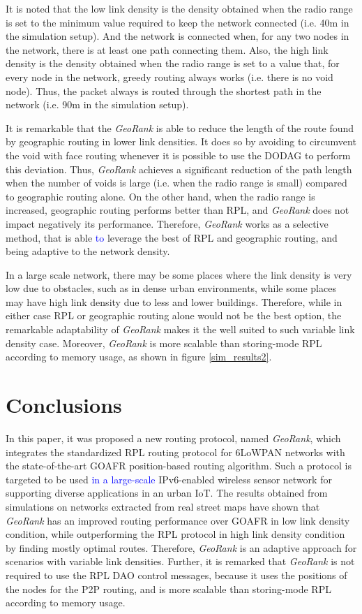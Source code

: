 \documentclass[final,authoryear,3p,twocolumn]{elsarticle}
\newcommand{\rev}{\textcolor{blue}}
\begin{document}
It is noted that the low link density is the density obtained when the radio range is set to the minimum value required to keep the network connected (i.e. 40m in the simulation setup). And the network is connected when, for any two nodes in the network, there is at least one path connecting them. Also, the high link density is the density obtained when the radio range is set to a value that, for every node in the network, greedy routing always works (i.e. there is no void node). Thus, the packet always is routed through the shortest path in the network (i.e. 90m in the simulation setup).

It is remarkable that the \textit{GeoRank} is able to reduce the length of the route found by geographic routing in lower link densities. It does so by avoiding to circumvent the void with face routing whenever it is possible to use the DODAG to perform this deviation. Thus, \textit{GeoRank} achieves a significant reduction of the path length when the number of voids is large (i.e. when the radio range is small) compared to geographic routing alone. On the other hand, when the radio range is increased, geographic routing performs better than RPL, and \textit{GeoRank} does not impact negatively its performance. Therefore, \textit{GeoRank} works as a selective method, that is able \rev{to} leverage the best of RPL and geographic routing, and being adaptive to the network density.

In a large scale network, there may be some places where the link density is very low due to obstacles, such as in dense urban environments, while some places may have high link density due to less and lower buildings. Therefore, while in either case RPL or geographic routing alone would not be the best option, the remarkable adaptability of \textit{GeoRank} makes it the well suited to such variable link density case. Moreover, \textit{GeoRank} is more scalable than storing-mode RPL according to memory usage, as shown in figure \ref{sim_results2}.

\section{Conclusions}
\label{secConclusion}

In this paper, it was proposed a new routing protocol, named \textit{GeoRank}, which integrates the standardized RPL routing protocol for 6LoWPAN networks with the state-of-the-art GOAFR position-based routing algorithm. 
Such a protocol is targeted to be used \rev{in a large-scale} IPv6-enabled wireless sensor network for supporting diverse applications in an urban IoT. The results obtained from simulations on networks extracted from real street maps have shown that \textit{GeoRank} has an improved routing performance over GOAFR in low link density condition, while outperforming the RPL protocol in high link density condition by finding mostly optimal routes. Therefore, \textit{GeoRank} is an adaptive approach for scenarios with variable link densities. Further, it is remarked that \textit{GeoRank} is not required to use the RPL DAO control messages, because it uses the positions of the nodes for the P2P routing, and is more scalable than storing-mode RPL according to memory usage. 
	
\end{document}
